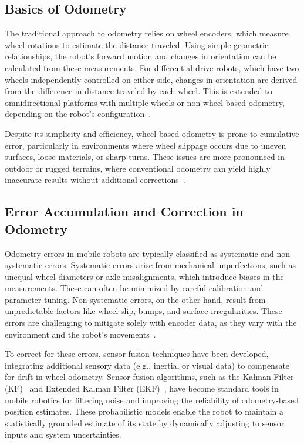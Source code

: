 \subsection{Basics of Odometry}

The traditional approach to odometry relies on wheel encoders, which measure wheel rotations to estimate the distance traveled. Using simple geometric relationships, the robot’s forward motion and changes in orientation can be calculated from these measurements. For differential drive robots, which have two wheels independently controlled on either side, changes in orientation are derived from the difference in distance traveled by each wheel. This is extended to omnidirectional platforms with multiple wheels or non-wheel-based odometry, depending on the robot's configuration~\cite{odometry_1996}.

Despite its simplicity and efficiency, wheel-based odometry is prone to cumulative error, particularly in environments where wheel slippage occurs due to uneven surfaces, loose materials, or sharp turns. These issues are more pronounced in outdoor or rugged terrains, where conventional odometry can yield highly inaccurate results without additional corrections~\cite{odometry_1996}.

\subsection{Error Accumulation and Correction in Odometry}

Odometry errors in mobile robots are typically classified as systematic and non-systematic errors. Systematic errors arise from mechanical imperfections, such as unequal wheel diameters or axle misalignments, which introduce biases in the measurements. These can often be minimized by careful calibration and parameter tuning. Non-systematic errors, on the other hand, result from unpredictable factors like wheel slip, bumps, and surface irregularities. These errors are challenging to mitigate solely with encoder data, as they vary with the environment and the robot’s movements~\cite{odometry_1996}.

To correct for these errors, sensor fusion techniques have been developed, integrating additional sensory data (e.g., inertial or visual data) to compensate for drift in wheel odometry. Sensor fusion algorithms, such as the Kalman Filter (KF)~\cite{kalman1960} and Extended Kalman Filter (EKF)~\cite{extended_kalman_filter}, have become standard tools in mobile robotics for filtering noise and improving the reliability of odometry-based position estimates. These probabilistic models enable the robot to maintain a statistically grounded estimate of its state by dynamically adjusting to sensor inputs and system uncertainties.

